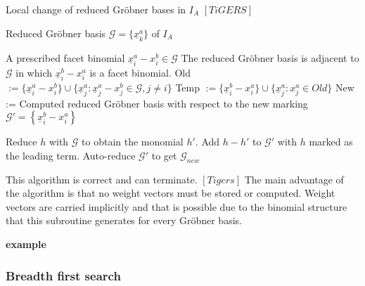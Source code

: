 \begin{algorithm}
\caption{Local change of reduced Gröbner bases in $I_A$ $\left[ TiGERS\right]  $}
\label{flip-alg}
\begin{algorithmic}[1]

\Require
Reduced Gröbner basis $ \mathcal{G} = \lbrace \underline{x}^{a}_{k}  \rbrace $ of $I_A$

A prescribed facet binomial $ \underline{x}^{a}_{i} - x^{b}_{i} \in \mathcal{G} $
\Ensure The reduced Gröbner basis is adjacent to $\mathcal{G}$ in which $ \underline{x}^{b}_{i} - x^{a}_{i} $ is a facet binomial.
\State Old 
$:= \lbrace \underline{x}^{a}_{i} - x^{b}_{i} \rbrace \cup
 \lbrace \underline{x}^{a}_{j} : \underline{x}^{a}_{j} - x^{b}_{j} \in \mathcal{G},
 j \neq i \rbrace $ 
 \State Temp $:= \lbrace \underline{x}^{b}_{i} - x^{a}_{i} \rbrace \cup 
 \lbrace \underline{x}^{a}_{j} : x^{a}_{j} \in Old  \rbrace $
 \State New := Computed reduced Gröbner basis with respect to the new marking 
 \State $\mathcal{G}' = \left\lbrace \underline{x}^{b}_{i} - x^{a}_{i} \right\rbrace  $
 
 \State Reduce $h$ with $\mathcal{G}$ to obtain the monomial $h'$.
 \State Add $h-h'$ to $\mathcal{G}'$ with $h$ marked as the leading term.
 \EndFor
 \State Auto-reduce $\mathcal{G}'$ to get $\mathcal{G}_{new}$

\end{algorithmic}
\end{algorithm}

This algorithm is correct and can terminate. $ \left[ Tigers \right] $
The main advantage of the algorithm is that no weight vectors must be stored or computed.
Weight vectors are carried implicitly and that is possible due to the binomial structure that this subroutine generates for every Gröbner basis.

\textbf{example}


\newpage

\subsubsection{Breadth first search}

